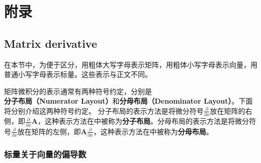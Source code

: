 \appendix
\chapter{附录}
	
\section{Matrix derivative}
\label{sec:matrix_derivative}

\begin{wenxintishi}
	在本节中，为便于区分，用粗体大写字母表示矩阵，用粗体小写字母表示向量，用普通小写字母表示标量。这些表示与正文不同。
\end{wenxintishi}

矩阵微积分的表示通常有两种符号约定，分别是\textbf{分子布局（Numerator Layout）}和\textbf{分母布局（Denominator Layout）}。下面将分别介绍这两种符号约定。
分子布局的表示方法是将微分符号$\frac{\partial}{\partial x}$放在矩阵的右侧，即$\frac{\partial}{\partial x}\bm{A}$，这种表示方法在\cite{matrix_cookbook}中被称为\textbf{分子布局}。分母布局的表示方法是将微分符号$\frac{\partial}{\partial x}$放在矩阵的左侧，即$\bm{A}\frac{\partial}{\partial x}$，这种表示方法在\cite{matrix_cookbook}中被称为\textbf{分母布局}。

\subsection{标量关于向量的偏导数}
